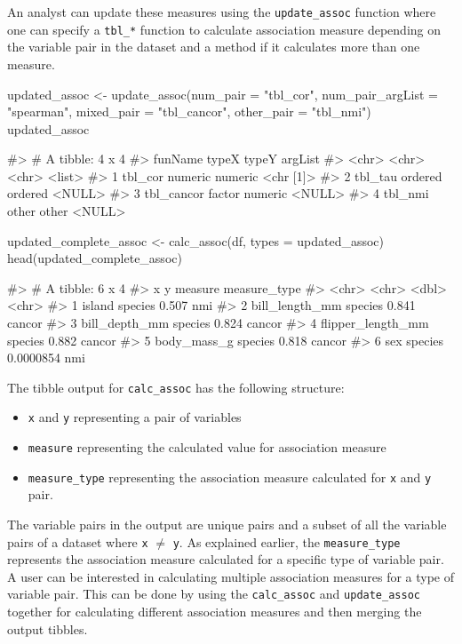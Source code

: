An analyst can update these measures using the \texttt{update\_assoc}
function where one can specify a \texttt{tbl\_*} function to calculate
association measure depending on the variable pair in the dataset and a
method if it calculates more than one measure.

\begin{Schunk}
\begin{Sinput}
updated_assoc <- update_assoc(num_pair = "tbl_cor",
                              num_pair_argList = "spearman",
                              mixed_pair = "tbl_cancor",
                              other_pair = "tbl_nmi")
updated_assoc
\end{Sinput}
\begin{Soutput}
#> # A tibble: 4 x 4
#>   funName    typeX   typeY   argList  
#>   <chr>      <chr>   <chr>   <list>   
#> 1 tbl_cor    numeric numeric <chr [1]>
#> 2 tbl_tau    ordered ordered <NULL>   
#> 3 tbl_cancor factor  numeric <NULL>   
#> 4 tbl_nmi    other   other   <NULL>
\end{Soutput}
\begin{Sinput}
updated_complete_assoc <- calc_assoc(df, types = updated_assoc)
head(updated_complete_assoc)
\end{Sinput}
\begin{Soutput}
#> # A tibble: 6 x 4
#>   x                 y         measure measure_type
#>   <chr>             <chr>       <dbl> <chr>       
#> 1 island            species 0.507     nmi         
#> 2 bill_length_mm    species 0.841     cancor      
#> 3 bill_depth_mm     species 0.824     cancor      
#> 4 flipper_length_mm species 0.882     cancor      
#> 5 body_mass_g       species 0.818     cancor      
#> 6 sex               species 0.0000854 nmi
\end{Soutput}
\end{Schunk}

The tibble output for \texttt{calc\_assoc} has the following structure:

\begin{itemize}
\tightlist
\item
  \texttt{x} and \texttt{y} representing a pair of variables
\item
  \texttt{measure} representing the calculated value for association
  measure
\item
  \texttt{measure\_type} representing the association measure calculated
  for \texttt{x} and \texttt{y} pair.
\end{itemize}

The variable pairs in the output are unique pairs and a subset of all
the variable pairs of a dataset where \texttt{x} \(\neq\) \texttt{y}. As
explained earlier, the \texttt{measure\_type} represents the association
measure calculated for a specific type of variable pair. A user can be
interested in calculating multiple association measures for a type of
variable pair. This can be done by using the \texttt{calc\_assoc} and
\texttt{update\_assoc} together for calculating different association
measures and then merging the output tibbles.

